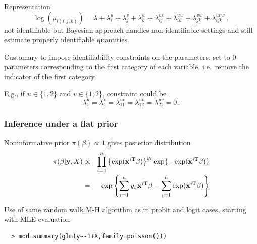 \begin{slide}

Representation 
$$
\log(\mu_{l(i,j,k)})=\lambda+\lambda^u_i+\lambda^v_j+\lambda^w_k+\lambda^{uv}_{ij}
+\lambda^{uw}_{ik}+\lambda^{vw}_{jk}+\lambda^{uvw}_{ijk}\,,
$$
not identifiable but Bayesian approach handles
non-identifiable settings and still estimate properly identifiable quantities. 

\pause
Customary to impose identifiability constraints
on the parameters: set to $0$ parameters corresponding to the first category of
each variable, i.e.~remove the indicator of the first category. 

\vs E.g., if $u\in\{1,2\}$ and $v\in\{1,2\}$, constraint could be
$$
\lambda^u_1=\lambda^v_1=\lambda^{uv}_{11}=\lambda^{uv}_{12}=\lambda^{uv}_{21}=0\,.
$$

\end{slide}
\begin{frame}[fragile]
\frametitle{Inference under a flat prior}

Noninformative prior $\pi(\beta)\propto 1$ gives posterior distribution
\small\begin{eqnarray*}
\pi(\beta|\mathbf{y},X) &\propto& \prod_{i=1}^n\left\{\exp(\mathbf{x}^{i\mathrm{T}}\beta)\right\}^{y_i}\exp\{-\exp(\mathbf{x}^{i\mathrm{T}}\beta)\}\\
&=& \exp\left\{ \sum_{i=1}^n y_i\,\mathbf{x}^{i\mathrm{T}} \beta - \sum_{i=1}^n \exp (\mathbf{x}^{i\mathrm{T}}\beta) \right\}\\
\end{eqnarray*}

\vs\pause
Use of same random walk M-H algorithm as in probit and logit cases, starting with
MLE evaluation
\begin{verbatim}
  > mod=summary(glm(y~-1+X,family=poisson()))
\end{verbatim}

\end{frame}
